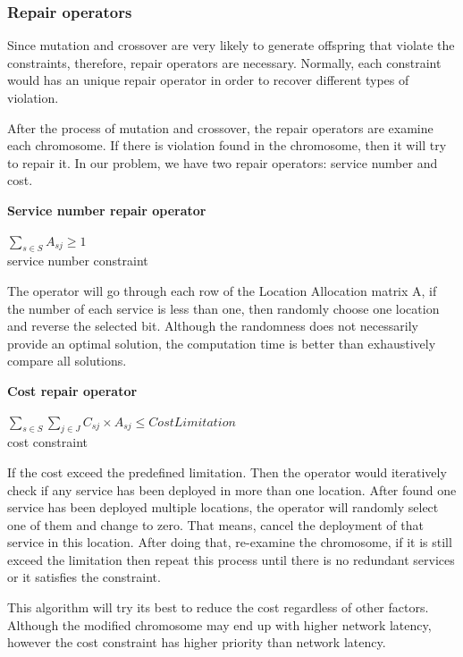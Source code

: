 \documentclass[twoside]{article}
\begin{document}
\subsubsection{Repair operators}
Since mutation and crossover are very likely to generate offspring that violate the constraints, therefore, 
repair operators are necessary. Normally, each constraint would has an unique repair operator 
in order to recover different types of violation.

After the process of mutation and crossover, the repair operators are examine each chromosome. 
If there is violation found in the chromosome, then it will try to repair it. 
In our problem, we have two repair operators: service number and cost.

\begin{flushleft}\textbf{Service number repair operator}\end{flushleft}
\begin{center}
		$\sum\limits_{s \in S} A_{sj} \geq 1$ \\
		service number constraint
\end{center}
The operator will go through each row of the Location Allocation matrix A, if the number of each 
service is less than one, then randomly choose one location and reverse the selected bit. 
Although the randomness does not necessarily provide an optimal solution, the computation time is 
better than exhaustively compare all solutions. 


\begin{flushleft}\textbf{Cost repair operator}\end{flushleft}
	\begin{center} 
		$\sum\limits_{s \in S} \sum\limits_{j \in J} C_{sj} \times A_{sj} \leq CostLimitation$ \\
		cost constraint
\end{center}

If the cost exceed the predefined limitation. Then the operator would iteratively check if any service has 
been deployed in more than one location. After found one service has been deployed multiple locations, 
the operator will randomly select one of them and change to zero. That means, cancel the deployment of 
that service in this location. After doing that, re-examine the chromosome, if it is still exceed the 
limitation then repeat this process until there is no redundant services or it satisfies the constraint.

This algorithm will try its best to reduce the cost regardless of other factors. Although the modified 
chromosome may end up with higher network latency, however the cost constraint has higher priority than network latency.
\end{document}
